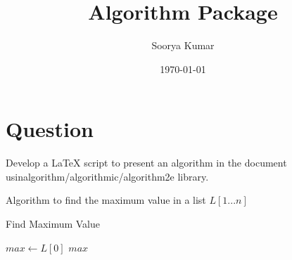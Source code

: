\documentclass{article}
\title{Algorithm Package}
\author{Soorya Kumar}
\date{\today}
\begin{document}
	\maketitle
	
	\section*{Question}
		{\large Develop a LaTeX script to present an algorithm in the document usinalgorithm/algorithmic/algorithm2e library.}\\
		
	\large{
		\begin{algorithm}[H]
			Algorithm to find the maximum value in a list $L[1...n]$
			\caption{Find Maximum Value}
			
			$max \leftarrow L[0]$\;
			\Return $max$\;
		\end{algorithm}
	}	
\end{document}
